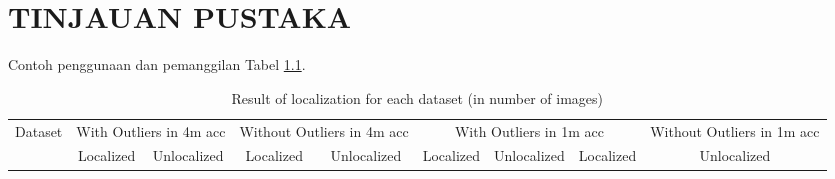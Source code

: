 \chapter{TINJAUAN PUSTAKA}
\label{cha:2-TelaahPustaka}


Contoh penggunaan dan pemanggilan Tabel \ref{tab:dataset}.

\begin{table}[H]
    
    \captionsetup{justification=centering}
	\caption{Result of localization for each dataset (in number of images)}
	\label{tab:dataset}
    \begin{adjustbox}{width=1\textwidth}
    
    \begin{tabular}{|l|c|c|c|c|c|c|c|c|}
    \hline
    
    \multirow{2}{*}{ Dataset} & \multicolumn{2}{c|}{With Outliers in 4m acc} & \multicolumn{2}{c|}{Without Outliers in 4m acc} & \multicolumn{3}{c|}{With Outliers in 1m acc} & \multicolumn{1}{c|}{Without Outliers in 1m acc}                     \\ \cline{2-9}
      & Localized      & Unlocalized & Localized         & Unlocalized & Localized      & Unlocalized & Localized         & Unlocalized \\ \hline
      

\end{tabular}
\end{adjustbox}
\end{table}
